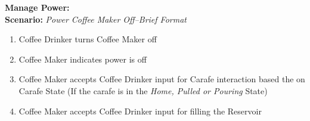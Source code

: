 \documentclass[letterpaper]{article}
\begin{document}
\noindent
\textbf{Manage Power: }\\
\textbf{Scenario: }\textit{Power Coffee Maker Off--Brief Format}
\begin{enumerate}
\item Coffee Drinker turns Coffee Maker off
\item Coffee Maker indicates power is off
\item Coffee Maker accepts Coffee Drinker input for Carafe
interaction based the on Carafe State (If the carafe is in the
\textit{Home, Pulled or Pouring} State)
\item Coffee Maker accepts Coffee Drinker input for filling the
Reservoir
\end{enumerate}
\end{document}
